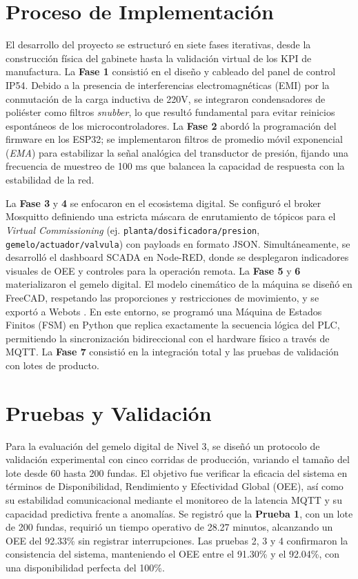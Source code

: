 \section{Proceso de Implementación}

El desarrollo del proyecto se estructuró en siete fases iterativas, desde la construcción física del gabinete hasta la validación virtual de los KPI de manufactura. La \textbf{Fase 1} consistió en el diseño y cableado del panel de control IP54. Debido a la presencia de interferencias electromagnéticas (EMI) por la conmutación de la carga inductiva de 220V, se integraron condensadores de poliéster como filtros \textit{snubber}, lo que resultó fundamental para evitar reinicios espontáneos de los microcontroladores. La \textbf{Fase 2} abordó la programación del firmware en los ESP32; se implementaron filtros de promedio móvil exponencial (\textit{EMA}) para estabilizar la señal analógica del transductor de presión, fijando una frecuencia de muestreo de 100 ms que balancea la capacidad de respuesta con la estabilidad de la red.

La \textbf{Fase 3} y \textbf{4} se enfocaron en el ecosistema digital. Se configuró el broker Mosquitto definiendo una estricta máscara de enrutamiento de tópicos para el \textit{Virtual Commissioning} (ej. \texttt{planta/dosificadora/presion}, \texttt{gemelo/actuador/valvula}) con payloads en formato JSON. Simultáneamente, se desarrolló el dashboard SCADA en Node-RED, donde se desplegaron indicadores visuales de OEE y controles para la operación remota. La \textbf{Fase 5} y \textbf{6} materializaron el gemelo digital. El modelo cinemático de la máquina se diseñó en FreeCAD, respetando las proporciones y restricciones de movimiento, y se exportó a Webots \cite{Fuller2020DigitalTwin}. En este entorno, se programó una Máquina de Estados Finitos (FSM) en Python que replica exactamente la secuencia lógica del PLC, permitiendo la sincronización bidireccional con el hardware físico a través de MQTT. La \textbf{Fase 7} consistió en la integración total y las pruebas de validación con lotes de producto.

\section{Pruebas y Validación}

Para la evaluación del gemelo digital de Nivel 3, se diseñó un protocolo de validación experimental con cinco corridas de producción, variando el tamaño del lote desde 60 hasta 200 fundas. El objetivo fue verificar la eficacia del sistema en términos de Disponibilidad, Rendimiento y Efectividad Global (OEE), así como su estabilidad comunicacional mediante el monitoreo de la latencia MQTT y su capacidad predictiva frente a anomalías. Se registró que la \textbf{Prueba 1}, con un lote de 200 fundas, requirió un tiempo operativo de 28.27 minutos, alcanzando un OEE del 92.33\% sin registrar interrupciones. Las pruebas 2, 3 y 4 confirmaron la consistencia del sistema, manteniendo el OEE entre el 91.30\% y el 92.04\%, con una disponibilidad perfecta del 100\%.

